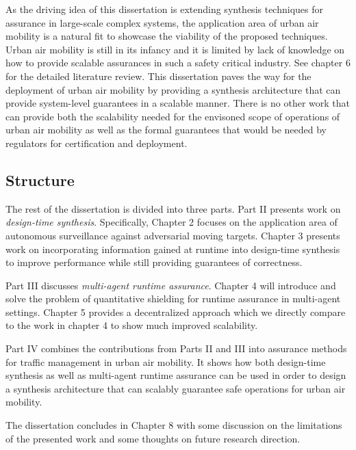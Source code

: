 As the driving idea of this dissertation is extending synthesis techniques for assurance in large-scale complex systems, the application area of urban air mobility is a natural fit to showcase the viability of the proposed techniques. Urban air mobility is still in its infancy and it is limited by lack of knowledge on how to provide scalable assurances in such a safety critical industry. See chapter 6 for the detailed literature review. This dissertation paves the way for the deployment of urban air mobility by providing a synthesis architecture that can provide system-level guarantees in a scalable manner. There is no other work that can provide both the scalability needed for the envisoned scope of operations of urban air mobility as well as the formal guarantees that would be needed by regulators for certification and deployment. 



\subsection{Structure}

The rest of the dissertation is divided into three parts. Part II presents work on \emph{design-time synthesis}. Specifically, Chapter 2 focuses on the application area of autonomous surveillance against adversarial moving targets. Chapter 3 presents work on incorporating information gained at runtime into design-time synthesis to improve performance while still providing guarantees of correctness. 

Part III discusses \emph{multi-agent runtime assurance}. Chapter 4 will introduce and solve the problem of quantitative shielding for runtime assurance in multi-agent settings. Chapter 5 provides a decentralized approach which we directly compare to the work in chapter 4 to show much improved scalability. 

Part IV combines the contributions from Parts II and III into assurance methods for traffic management in urban air mobility. It shows how both design-time synthesis as well as multi-agent runtime assurance can be used in order to design a synthesis architecture that can scalably guarantee safe operations for urban air mobility. 

The dissertation concludes in Chapter 8 with some discussion on the limitations of the presented work and some thoughts on future research direction. 




